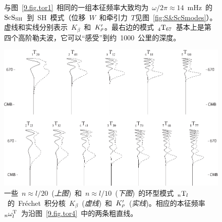 \begin{figure}[!b]
\begin{center}
\end{center}
\caption[torkernels2]{\label{9.fig.tor2}
与图~\ref{9.fig.tor1}~相同的一组本征频率大致均为~$\omega/2\pi\approx 14$~mHz~的~${\rm ScS}_{\rm SH}$~到~SH~模式（位移~$W$~和牵引力~$T$见图~\ref{fig:S&ScSmodes}）。虚线和实线分别表示~$K_{\beta}$~和~$K_{\raisebox{0.3 ex}{\scriptsize$\rho$}}^{\prime}$。最右边的模式~${}_4{\rm T}_{67}$~基本上是第四个高阶勒夫波，它可以“感受”到约~1000~公里的深度。
}
\end{figure}
\begin{figure}[!b]
\begin{center}
\includegraphics{../figures/chap09/fig03.eps}
\end{center}
\caption[torkernels3]{\label{9.fig.tor3}
一些~$n\approx l/20$~({\em 上图\/})~和~$n\approx l/10$~({\em 下图\/})~的环型模式~${}_n{\rm T}_l$~的~Fr\'{e}chet~积分核~$K_{\beta}$~({\em 虚线\/})~和~$K_{\raisebox{0.2 ex}{\scriptsize$\rho$}}^{\prime}$~({\em 实线\/})。相应的本征频率~${}_n\omega_l^{\rm T}$~为沿图~\ref{9.fig.tor4}~中的两条粗直线。
}
\end{figure}
